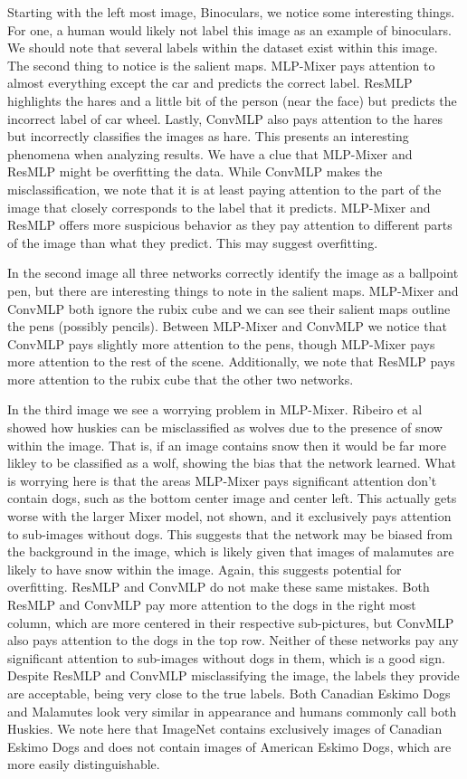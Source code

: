 \documentclass[final]{cvpr}
\begin{document}
Starting with the left most image, Binoculars, we notice some interesting things. 
For one, a human would likely not label this image as an example of binoculars.
We should note that several labels within the dataset exist within this image.
The second thing to notice is the salient maps. 
MLP-Mixer pays attention to almost everything except the car and predicts the correct label.
ResMLP highlights the hares and a little bit of the person (near the face) but predicts the incorrect label of car wheel.
Lastly, ConvMLP also pays attention to the hares but incorrectly classifies the images as hare.
This presents an interesting phenomena when analyzing results. 
We have a clue that MLP-Mixer and ResMLP might be overfitting the data.
While ConvMLP makes the misclassification, we note that it is at least paying attention to the part of the image that closely corresponds to the label that it predicts. 
MLP-Mixer and ResMLP offers more suspicious behavior as they pay attention to different parts of the image than what they predict.
This may suggest overfitting. 


In the second image all three networks correctly identify the image as a ballpoint pen, but there are interesting things to note in the salient maps. 
MLP-Mixer and ConvMLP both ignore the rubix cube and we can see their salient maps outline the pens (possibly pencils). 
Between MLP-Mixer and ConvMLP we notice that ConvMLP pays slightly more attention to the pens, though MLP-Mixer pays more attention to the rest of the scene.
Additionally, we note that ResMLP pays more attention to the rubix cube that the other two networks. 

In the third image we see a worrying problem in MLP-Mixer. 
Ribeiro et al\cite{ribeiro2016why} showed how huskies can be misclassified as wolves due to the presence of snow within the image. 
That is, if an image contains snow then it would be far more likley to be classified as a wolf, showing the bias that the network learned. 
What is worrying here is that the areas MLP-Mixer pays significant attention don't contain dogs, such as the bottom center image and center left.
This actually gets worse with the larger Mixer model, not shown, and it exclusively pays attention to sub-images without dogs. 
This suggests that the network may be biased from the background in the image, which is likely given that images of malamutes are likely to have snow within the image.
Again, this suggests potential for overfitting.
ResMLP and ConvMLP do not make these same mistakes. 
Both ResMLP and ConvMLP pay more attention to the dogs in the right most column, which are more centered in their respective sub-pictures, but ConvMLP also pays attention to the dogs in the top row. 
Neither of these networks pay any significant attention to sub-images without dogs in them, which is a good sign.
Despite ResMLP and ConvMLP misclassifying the image, the labels they provide are acceptable, being very close to the true labels. 
Both Canadian Eskimo Dogs and Malamutes look very similar in appearance and humans commonly call both Huskies. 
We note here that ImageNet contains exclusively images of Canadian Eskimo Dogs and does not contain images of American Eskimo Dogs, which are more easily distinguishable. 
\end{document}

